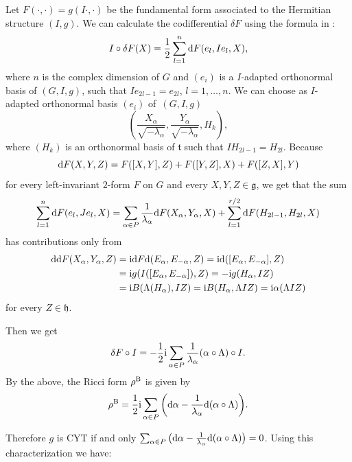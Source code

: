 \documentclass[10pt,a4paper]{amsart}
\numberwithin{equation}{section}
\begin{document}
Let $F(\cdot, \cdot) = g (I \cdot, \cdot)$ be the fundamental form associated to the Hermitian structure $(I, g)$.
We can calculate the codifferential $\delta F$ using the formula in \cite{Gau}:
\begin{equation*}%
I \circ \delta F (X) = \frac 12 \sum_{l=1}^{n} {\rm d}F (e_l, I e_l, X),
\end{equation*}
where $n$ is the complex dimension of $G$ and $(e_i)$ is a $I$-adapted orthonormal basis of $(G, I, g)$, such that $I e_{2l -1} = e_{2l}$, $l = 1, \dots, n$. We can choose as $I$-adapted orthonormal basis $(e_i)$ of~$(G, I, g)$
\[
\left(\frac{X_{\alpha}}{ \sqrt{-\lambda_{\alpha}}},\frac{Y_{\alpha}}{ \sqrt{- \lambda_{\alpha}}}, H_k \right),
\]
where $(H_k)$ is an orthonormal basis of $\mathfrak t$ such that $I H_{2l -1} = H_{2l}$.
Because
\[
{\rm d}F(X,Y,Z)=F([X,Y],Z)+F([Y,Z],X)+F([Z,X],Y)
\]
 for every left-invariant $2$-form $F$ on $G$ and every $X,Y, Z \in \mathfrak g$, we get that the sum
 \[
 \sum_{l=1}^{n} {\rm d}F(e_l, Je_l, X) = \sum_{\alpha \in P} \frac{1}{\lambda_{\alpha}} {\rm d}F(X_{\alpha}, Y_{\alpha}, X) + \sum_{l =1}^{r/2} {\rm d}F( H_{2l -1}, H_{2l}, X)
 \]
 has
contributions only from
\begin{align*}
{\rm d}{\rm d}F(X_{\alpha}, Y_{\alpha}, Z) &= {\rm i}{\rm d}F{\rm d}(E_{\alpha},E_{-\alpha}, Z) = {\rm i}{\rm d}([E_{\alpha}, E_{-\alpha}], Z)\\
& = {\rm i}g (I ([E_{\alpha}, E_{-\alpha}]), Z) = - {\rm i}g( H_{\alpha}, IZ)\\
& = {\rm i}B (\Lambda( H_{\alpha}), IZ) = {\rm i}B (H_{\alpha}, \Lambda IZ) = {\rm i}\alpha (\Lambda I Z)
\end{align*}
 for every $Z\in \mathfrak{h}$.

Then we get
\[
\delta F \circ
I = - \frac {1} {2} {\rm i} \sum_{\alpha \in P} \frac{1} {\lambda_{\alpha}} (\alpha \circ \Lambda) \circ I.
\]
 By the above, the Ricci form $\rho^{\rm B}$ is given by
\[
\rho^{\rm B} = \frac{1}{2} {\rm i} \sum_{\alpha \in P} \bigg({\rm d}\alpha - \frac{1}{\lambda_{\alpha}} {\rm d} (\alpha\circ\Lambda) \bigg).
\]

Therefore $g$ is CYT if and only $\sum_{\alpha \in P} \big({\rm d}\alpha - \frac{1}{\lambda_{\alpha}} {\rm d}(\alpha\circ\Lambda) \big ) =0$. Using this characterization we have:
\end{document}
